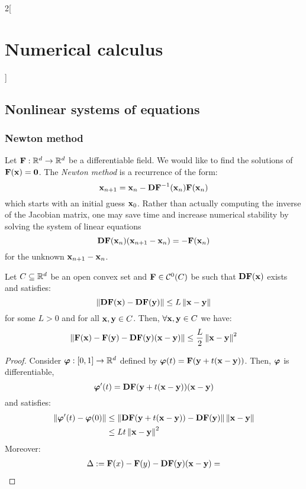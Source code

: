 \documentclass[../../../main_math.tex]{subfiles}
\begin{document}
\begin{multicols}{2}[\section{Numerical calculus}]
  \subsection{Nonlinear systems of equations}
  \subsubsection{Newton method}
  \begin{definition}
    Let $\vf{F}:\RR^d\rightarrow\RR^d$ be a differentiable field. We would like to find the solutions of $\vf{F}(\vf{x})=\vf{0}$.
    The \emph{Newton method} is a recurrence of the form:
    \begin{equation*}
      \vf{x}_{n+1}=\vf{x}_n-\vf{DF}^{-1}(\vf{x}_n)\vf{F}(\vf{x}_n)
    \end{equation*}
    which starts with an initial guess $\vf{x}_0$.
    Rather than actually computing the inverse of the Jacobian matrix, one may save time and increase numerical stability by solving the system of linear equations
    $$
      \vf{DF}(\vf{x}_n)(\vf{x}_{n+1}-\vf{x}_n)=-\vf{F}(\vf{x}_n)
    $$
    for the unknown $\vf{x}_{n+1}-\vf{x}_n$.
  \end{definition}
  \begin{lemma}\label{NC:preNewton}
    Let $C\subseteq \RR^d$ be an open convex set and $\vf{F}\in\mathcal{C}^0(C)$ be such that $\vf{DF}(\vf{x})$ exists and satisfies:
    $$
      \norm{\vf{DF}(\vf{x})-\vf{DF}(\vf{y})}\leq L\norm{\vf{x}-\vf{y}}
    $$
    for some $L>0$ and for all $\vf{x},\vf{y}\in C$. Then, $\forall \vf{x}, \vf{y}\in C$ we have:
    $$
      \norm{\vf{F}(\vf{x}) - \vf{F}(\vf{y}) - \vf{DF}(\vf{y})(\vf{x}-\vf{y})}\leq \frac{L}{2}\norm{\vf{x}-\vf{y}}^2
    $$
  \end{lemma}
  \begin{proof}
    Consider $\vf\varphi:[0,1]\rightarrow\RR^d$ defined by $\vf\varphi(t)=\vf{F}(\vf{y} + t(\vf{x}-\vf{y}))$. Then, $\vf\varphi$ is differentiable,
    $$
      \vf\varphi'(t) = \vf{DF}(\vf{y} + t(\vf{x}-\vf{y}))(\vf{x}-\vf{y})
    $$
    and satisfies:
    \begin{align*}
      \norm{\vf\varphi'(t) -\vf\varphi(0)} & \leq \norm{\vf{DF}(\vf{y}+t(\vf{x}-\vf{y})) - \vf{DF}(\vf{y})}\norm{\vf{x}-\vf{y}} \\
                                           & \leq Lt\norm{\vf{x}-\vf{y}}^2
    \end{align*}
    Moreover:
    \begin{multline*}
      \Delta :=\vf{F}(x) - \vf{F}(y) - \vf{DF}(\vf{y})(\vf{x}-\vf{y})= \\

\end{multline*}
\end{proof}
\end{multicols}
\end{document}

